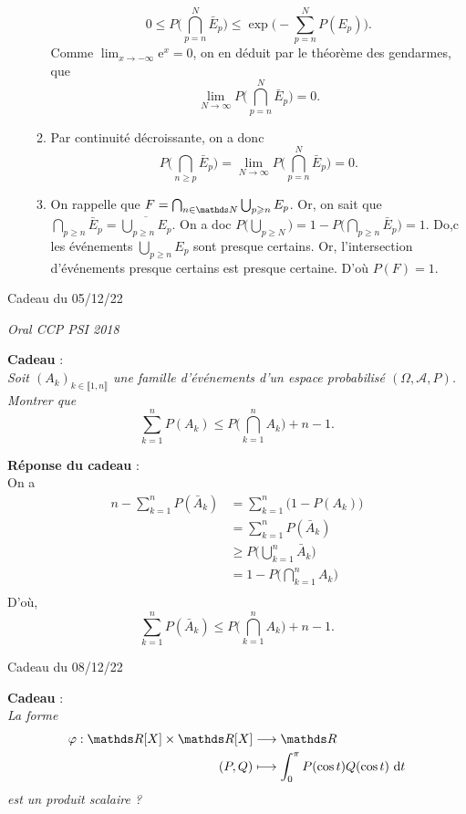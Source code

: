 \documentclass[a4paper]{article}
\begin{document}
\begin{enumerate}
\begin{enumerate}[start=2]
\[						0 \le P\Big(\bigcap_{p=n}^N \bar{E}_p\Big) \le \exp\Big(-\sum_{p=n}^N P(E_p) \Big)
					.\] Comme $\lim_{x\to -\infty} \mathrm{e}^{x} = 0$, on en déduit par le théorème des gendarmes, que \[
						\lim_{N\to \infty} P\Big(\bigcap_{p=n}^N \bar{E}_p\Big) = 0
					.\]
				\item Par continuité décroissante, on a donc \[
						P\Big(\bigcap_{n \ge p} \bar{E}_p\Big) = \lim_{N\to \infty} P\Big(\bigcap_{p=n}^N \bar{E}_p\Big) = 0
					.\]
				\item On rappelle que $F = \bigcap_{n \in \N} \bigcup_{p \ge n} E_p$. Or, on sait que $\bigcap_{p \ge n} \bar{E}_p = \overline{\bigcup_{p \ge n} E_p}$. On a doc $P\big(\bigcup_{p\ge N}\big) = 1 - P\big(\bigcap_{p \ge n} \bar{E}_p\big) = 1$. Do,c les événements $\bigcup_{p \ge n} E_p$\/ sont presque certains. Or, l'intersection d'événements presque certains est presque certaine. D'où $P(F) = 1$.
			\end{enumerate}
	\end{enumerate}
	\clearpage
	\centerline{\LARGE Cadeau du 05/12/22}
	\centerline{\textit{Oral CCP PSI 2018}}

	\bigskip
	\bigskip
	\textbf{Cadeau} :\\
	\textsl{Soit $(A_k)_{k \in \llbracket 1,n \rrbracket}$\/ une famille d'événements d'un espace probabilisé $(\Omega, \mathcal{A}, P)$. Montrer que \[
		\sum_{k=1}^n P(A_k) \le P\Big(\bigcap_{k=1} ^n A_k\Big) + n - 1
	.\]}
	\bigskip
	\bigskip

	\textbf{Réponse du cadeau} :\\
	On a
	\begin{align*}
		n - \sum_{k=1}^n P(\bar{A}_k) &= \sum_{k=1}^n \big(1 - P(A_k)\big)\\
		&= \sum_{k=1}^n P(\bar{A}_k) \\
		&\ge P\Big(\bigcup_{k=1}^n \bar{A}_k\Big) \\
		&= 1 - P\Big(\bigcap_{k=1}^n A_k\Big) \\
	\end{align*}
	D'où, \[
		\sum_{k=1}^n P(\bar{A}_k) \le P\Big(\bigcap_{k=1}^n A_k\Big) + n - 1
	.\]

	\clearpage
	\centerline{\LARGE Cadeau du 08/12/22}

	\bigskip
	\bigskip
	\textbf{Cadeau} :\\
	\textsl{La forme \begin{align*}
		\varphi: \R[X] \times \R[X] &\longrightarrow \R \\
		(P,Q) &\longmapsto \int_{0}^{\pi} P(\cos t) Q(\cos t)~\mathrm{d}t
	\end{align*}
	est un produit scalaire ?}
\end{document}
